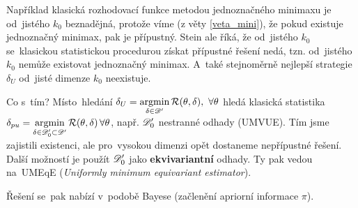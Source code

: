 \begin{dusl}
	Například klasická rozhodovací funkce metodou jednoznačného minimaxu je od~jistého $k_0$ beznadějná, protože víme (z věty \ref{veta_mini}), že pokud existuje jednoznačný minimax, pak je přípustný. Stein ale říká, že od~jistého $k_0$ se~klasickou statistickou procedurou získat přípustné řešení nedá, tzn. od~jistého $k_0$ nemůže existovat jednoznačný minimax. A~také stejnoměrně nejlepší strategie $\delta_U$ od~jisté dimenze $k_0$ neexistuje.
\end{dusl}
Co s~tím? Místo~hledání $\delta_U=\mathop{\mathrm{argmin}}\limits_{\delta\in\mathscr{D}'}\mathcal{R}(\theta,\delta),~\forall\theta$ hledá klasická statistika $\delta_{pu}=\mathop{\mathrm{argmin}}\limits_{\delta\in\mathscr{D}'_0\subset\mathscr{D}' }\mathcal{R}(\theta,\delta)\,\forall\theta$, např. $\mathscr{D}'_0$ nestranné odhady (UMVUE). Tím jsme zajistili existenci, ale pro~vysokou dimenzi opět dostaneme nepřípustné řešení. Další možností je použít $\mathscr{D}_0'$ jako \textbf{ekvivariantní} odhady. Ty pak vedou na~UMEqE (\textit{Uniformly minimum equivariant estimator}).  

Řešení se~pak nabízí v~podobě Bayese (začlenění apriorní informace $\pi$).
